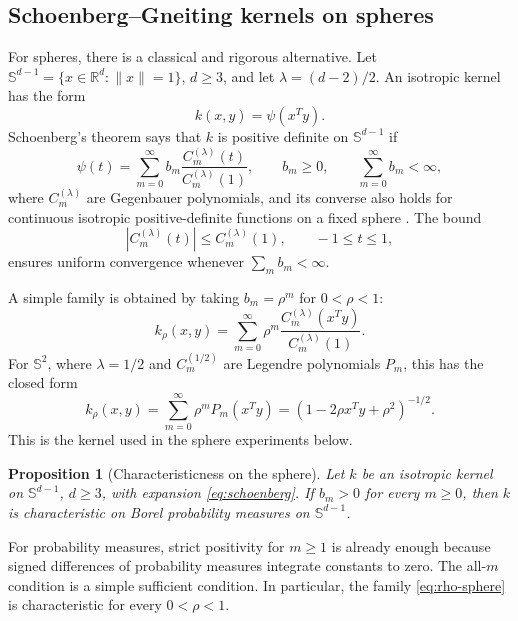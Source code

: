 \documentclass[11pt]{article}
\newtheorem{proposition}[theorem]{Proposition}
\newcommand{\R}{\mathbb{R}}
\newcommand{\1}{\mathbf{1}}
\newcommand{\Sphere}{\mathbb{S}}
\begin{document}
\subsection{Schoenberg--Gneiting kernels on spheres}

For spheres, there is a classical and rigorous alternative. Let $\Sphere^{d-1}=\{x\in\R^d:\|x\|=1\}$, $d\ge3$, and let $\lambda=(d-2)/2$. An isotropic kernel has the form
\[
k(x,y)=\psi(x^Ty).
\]
Schoenberg's theorem says that $k$ is positive definite on $\Sphere^{d-1}$ if
\begin{equation}
\label{eq:schoenberg}
\psi(t)=\sum_{m=0}^\infty b_m\frac{C_m^{(\lambda)}(t)}{C_m^{(\lambda)}(1)},
\qquad
b_m\ge0,
\qquad
\sum_{m=0}^\infty b_m<\infty,
\end{equation}
where $C_m^{(\lambda)}$ are Gegenbauer polynomials, and its converse also holds for continuous isotropic positive-definite functions on a fixed sphere \citep{schoenberg_1942_PositiveDefiniteFunctions, gneiting_2013_StrictlyNonstrictlyPositive}. The bound
\[
|C_m^{(\lambda)}(t)|\le C_m^{(\lambda)}(1),\qquad -1\le t\le1,
\]
ensures uniform convergence whenever $\sum_m b_m<\infty$.

A simple family is obtained by taking $b_m=\rho^m$ for $0<\rho<1$:
\begin{equation}
\label{eq:rho-sphere}
k_\rho(x,y)=\sum_{m=0}^\infty \rho^m\frac{C_m^{(\lambda)}(x^Ty)}{C_m^{(\lambda)}(1)}.
\end{equation}
For $\mathbb{S}^2$, where $\lambda=1/2$ and $C_m^{(1/2)}$ are Legendre polynomials $P_m$, this has the closed form
\begin{equation}
\label{eq:s2-poisson}
k_\rho(x,y)=\sum_{m=0}^\infty \rho^m P_m(x^Ty)
=(1-2\rho x^Ty+\rho^2)^{-1/2}.
\end{equation}
This is the kernel used in the sphere experiments below.

\begin{proposition}[Characteristicness on the sphere]
\label{prop:sphere-characteristic}
Let $k$ be an isotropic kernel on $\Sphere^{d-1}$, $d\ge3$, with expansion \eqref{eq:schoenberg}. If $b_m>0$ for every $m\ge0$, then $k$ is characteristic on Borel probability measures on $\Sphere^{d-1}$.
\end{proposition}

For probability measures, strict positivity for $m\ge1$ is already enough because signed differences of probability measures integrate constants to zero. The all-$m$ condition is a simple sufficient condition. In particular, the family \eqref{eq:rho-sphere} is characteristic for every $0<\rho<1$.
\end{document}
